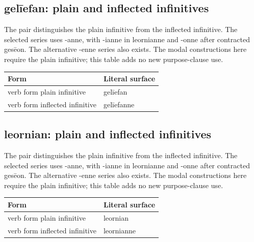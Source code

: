 \subsection*{gelīefan: plain and inflected infinitives}

The pair distinguishes the plain infinitive from the inflected infinitive. The selected series uses -anne, with -ianne in leornianne and -onne after contracted gesēon. The alternative -enne series also exists. The modal constructions here require the plain infinitive; this table adds no new purpose-clause use.

\par\begingroup
\fontsize{10.5}{13.2}\selectfont
\setlength{\LTleft}{0pt}\setlength{\LTright}{\fill}
\noindent
\begin{tabular}{@{}>{\raggedright\arraybackslash}p{73.68mm}>{\raggedright\arraybackslash}p{47.51mm}@{}}
\toprule
\textbf{Form} & \textbf{Literal surface} \\
\midrule
verb form plain infinitive & gelīefan \\
verb form inflected infinitive & gelīefanne \\
\bottomrule
\end{tabular}
\par\endgroup

\subsection*{leornian: plain and inflected infinitives}

The pair distinguishes the plain infinitive from the inflected infinitive. The selected series uses -anne, with -ianne in leornianne and -onne after contracted gesēon. The alternative -enne series also exists. The modal constructions here require the plain infinitive; this table adds no new purpose-clause use.

\par\begingroup
\fontsize{10.5}{13.2}\selectfont
\setlength{\LTleft}{0pt}\setlength{\LTright}{\fill}
\noindent
\begin{tabular}{@{}>{\raggedright\arraybackslash}p{73.68mm}>{\raggedright\arraybackslash}p{47.51mm}@{}}
\toprule
\textbf{Form} & \textbf{Literal surface} \\
\midrule
verb form plain infinitive & leornian \\
verb form inflected infinitive & leornianne \\
\bottomrule
\end{tabular}
\par\endgroup

